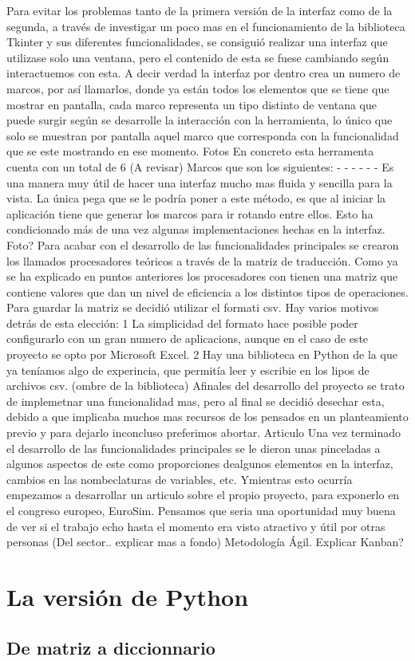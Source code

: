 Para evitar los problemas tanto de la primera  versión de la interfaz como de la segunda, a través de investigar un poco mas en el funcionamiento  de la biblioteca Tkinter y sus diferentes funcionalidades, se consiguió realizar una interfaz que utilizase solo  una ventana, pero  el contenido  de esta se  fuese cambiando según interactuemos con esta. A decir verdad la interfaz por dentro crea un numero de  marcos, por así llamarlos, donde ya están todos los elementos que se tiene que mostrar en pantalla, cada marco representa un tipo distinto de ventana que puede surgir según se desarrolle la interacción con la herramienta, lo único que solo se muestran por pantalla aquel marco que corresponda con la funcionalidad que se este mostrando en ese momento.
Fotos
En concreto esta herramenta cuenta con un total de 6 (A revisar) Marcos que son los siguientes:
-
-
-
-
-
-
Es una manera muy útil de hacer una interfaz mucho mas fluida y sencilla para la vista. La única pega que se le podría poner a este método, es que al iniciar la aplicación tiene que generar los marcos para ir rotando entre ellos. Esto ha condicionado más de una vez algunas implementaciones hechas en la interfaz.
Foto?
Para acabar con el desarrollo de las funcionalidades principales se crearon los llamados procesadores teóricos a través de la matriz de traducción. Como ya se ha explicado en puntos anteriores los procesadores con tienen una matriz que contiene valores que dan un nivel de eficiencia a los distintos tipos de operaciones. Para guardar la matriz se decidió utilizar el formati csv. Hay varios motivos detrás de esta elección:
1 La simplicidad del formato hace posible poder configurarlo con un gran numero de aplicacions, aunque en el caso de este proyecto se opto por Microsoft Excel.
2	Hay una biblioteca en Python de la que ya teníamos algo  de experincia, que permitía leer y escribie en los lipos de archivos csv. (ombre de la biblioteca)
Afinales del desarrollo del proyecto se trato de implemetnar una funcionalidad mas, pero al final  se decidió desechar esta, debido a que implicaba muchos mas recursos de los pensados en un planteamiento previo y para dejarlo inconcluso  preferimos abortar.
Articulo
Una vez terminado el desarrollo de las funcionalidades principales se le dieron unas pinceladas a algunos aspectos de este como proporciones dealgunos  elementos en la interfaz, cambios en las nombeclaturas de variables, etc. Ymientras esto ocurría empezamos a desarrollar un articulo sobre el propio proyecto, para exponerlo en el congreso europeo, EuroSim. Pensamos que seria una oportunidad muy buena  de ver si el trabajo echo hasta el momento era visto atractivo y útil por otras personas (Del sector.. explicar mas a  fondo)
Metodología Ágil.
Explicar Kanban?

\section{La versión de Python}

\subsection{De matriz a diccionnario}